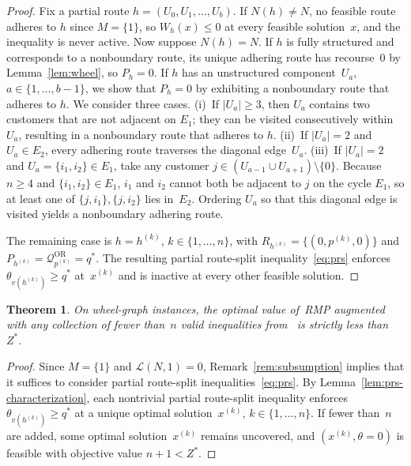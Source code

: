 \documentclass{article}
\newtheorem{theorem}{Theorem}
\begin{document}
{\begin{proof}
Fix a partial route $h = (U_0, U_1, \ldots, U_b)$. If $N(h) \neq N$, no feasible route adheres to $h$ since $M=\{1\}$, so $W_h(x) \leq 0$ at every feasible solution~$x$, and the inequality is never active. Now suppose $N(h)=N$. If $h$ is fully structured and corresponds to a nonboundary route, its unique adhering route has recourse~$0$ by Lemma~\ref{lem:wheel}, so $P_h=0$. If $h$ has an unstructured component~$U_a$, $a \in \{1,\dots,b-1\}$, we show that $P_h=0$ by exhibiting a nonboundary route that adheres to $h$. We consider three cases. (i)~If $|U_a|\ge 3$, then $U_a$ contains two customers that are not adjacent on $E_1$; they can be visited consecutively within $U_a$, resulting in a nonboundary route that adheres to $h$. (ii)~If $|U_a|=2$ and $U_a \in E_2$, every adhering route traverses the diagonal edge~$U_a$. (iii)~If $|U_a|=2$ and $U_a = \{i_1, i_2\} \in E_1$, take any customer $j \in (U_{a-1} \cup U_{a+1}) \setminus \{0\}$. Because $n \geq 4$ and $\{i_1, i_2\} \in E_1$, $i_1$ and $i_2$ cannot both be adjacent to $j$ on the cycle $E_1$, so at least one of $\{j, i_1\}, \{j, i_2\}$ lies in~$E_2$. Ordering $U_a$ so that this diagonal edge is visited yields a nonboundary adhering route.

The remaining case is $h = h^{(k)}$, $k \in \{1,\dots,n\}$, with $R_{h^{(k)}} = \{(0,p^{(k)},0)\}$ and $P_{h^{(k)}} = \mathcal{Q}^{\text{OR}}_{p^{(k)}} = q^*$. The resulting partial route-split inequality~\eqref{eq:prs} enforces $\theta_{v(h^{(k)})} \geq q^*$ at~$x^{(k)}$ and is inactive at every other feasible solution.
\end{proof}

\begin{theorem}\label{thm:n-HS}
On wheel-graph instances, the optimal value of~RMP augmented with any collection of fewer than~$n$ valid inequalities from~\cite{hoogendoorn2023improved} is strictly less than~$Z^*$.
\end{theorem}

\begin{proof}
Since $M=\{1\}$ and $\mathcal{L}(N,1) = 0$, Remark~\ref{rem:subsumption} implies that it suffices to consider partial route-split inequalities~\eqref{eq:prs}. By Lemma~\ref{lem:prs-characterization}, each nontrivial partial route-split inequality enforces $\theta_{v(h^{(k)})} \geq q^*$ at a unique optimal solution~$x^{(k)}$, $k \in \{1,\dots,n\}$. If fewer than~$n$ are added, some optimal solution~$x^{(k)}$ remains uncovered, and $(x^{(k)}, \theta = 0)$ is feasible with objective value $n+1 < Z^*$.
\end{proof}
}
\end{document}
